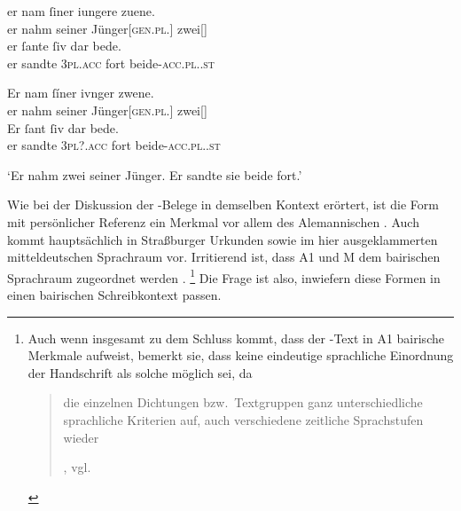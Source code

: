 \begin{exe}
\ex \label{ex:siubedea1m}
	\begin{xlist}
	\ex \label{ex:siubedea1m_1}
		\begin{taggedline}{\parencites[\pno~16vb,28--29]{kc:A1}}
		\gll er nam ſiner iungere zuene. \\
			er nahm seiner Jünger[\textsc{gen.pl.\MascM}] zwei[\MascM] \\
	\sn \gll er ſante ſiv dar bede. \\
			er sandte \textsc{3pl\subM.acc} fort beide-\textsc{acc.pl.\MascM.st} \\
		\end{taggedline}
	
	\ex \label{ex:siubedea1m_2}
		\gll Er nam ſíner ivnger zwene. \\
			er nahm seiner Jünger[\textsc{gen.pl.\MascM}] zwei[\MascM] \\
	\sn \gll Er ſant ſiv dar bede. \\
			er sandte \textsc{3pl\subM?.acc} fort beide-\textsc{acc.pl.\MascM.st} \\
		\begin{taggedline}{\parencites[\pno~29va,18--19]{kc:M}[3938]{schroeder1895}}
		\trans `Er nahm zwei seiner Jünger. Er sandte sie beide fort.'
		\end{taggedline}
\end{xlist}
\end{exe}

Wie bei der Diskussion der \CAO{}-Belege in demselben Kontext
erörtert, ist die Form  mit persönlicher Referenz ein Merkmal vor
allem des Alemannischen \autocite[vgl.][395]{ksw2}. Auch  kommt
hauptsächlich in Straßburger Urkunden sowie im hier ausgeklammerten
mitteldeutschen Sprachraum vor. Irritierend ist, dass A1 und
M dem bairischen Sprachraum zugeordnet werden
\autocites{wolf:kckat}[266--276]{fleischer2019}.%
%
	\footnote{Auch wenn \citet[40--41]{schneider1987} insgesamt zu dem Schluss
		kommt, dass der \KC{}-Text in A1 bairische Merkmale
		aufweist, bemerkt sie, dass keine eindeutige sprachliche Einordnung der
		Handschrift als solche möglich sei, da
		\blockquote[{\cite[40]{schneider1987},
		vgl.~\nosh\cites[519]{gaertner1999}[1638]{2vl11}}]{die einzelnen
		Dichtungen bzw.\ Textgruppen ganz unterschiedliche sprachliche
		Kriterien auf, \textelp{} auch verschiedene zeitliche
		Sprachstufen wieder }.%
	}
%
Die Frage ist also, inwiefern diese Formen in einen bairischen Schreib\-kontext
passen.


